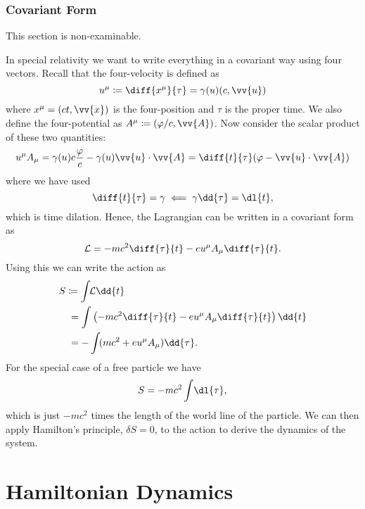 \documentclass[fleqn]{NotesClass}
\newcommand*{\lagrangian}{\mathcal{L}}
\begin{document}
    \subsection{Covariant Form}
    \begin{rmk}
        This section is non-examinable.
    \end{rmk}
    
    In special relativity we want to write everything in a covariant way using four vectors.
    Recall that the four-velocity is defined as
    \begin{equation}
        u^\mu \coloneqq \diff{x^\mu}{\tau} = \gamma(u)(c, \vv{u})
    \end{equation}
    where \(x^\mu = (ct, \vv{x})\) is the four-position and \(\tau\) is the proper time.
    We also define the four-potential as \(A^\mu \coloneqq (\varphi/c, \vv{A})\).
    Now consider the scalar product of these two quantities:
    \begin{align}
        u^\mu A_\mu = \gamma(u)c\frac{\varphi}{c} - \gamma(u)\vv{u}\cdot\vv{A} = \diff{t}{\tau}(\varphi - \vv{u}\cdot\vv{A})
    \end{align}
    where we have used
    \begin{equation}
        \diff{t}{\tau} = \gamma \impliedby \gamma \dd{\tau} = \dl{t},
    \end{equation}
    which is time dilation.
    Hence, the Lagrangian can be written in a covariant form as
    \begin{equation}
        \lagrangian = -mc^2\diff{\tau}{t} - eu^\mu A_\mu \diff{\tau}{t}.
    \end{equation}
    Using this we can write the action as
    \begin{align}
        S &\coloneqq \int \!\! \lagrangian \dd{t}\\
        &\hphantom{:}= \int \left( -mc^2\diff{\tau}{t} - eu^\mu A_\mu \diff{\tau}{t} \right)\dd{t}\\
        &\hphantom{:}= -\int \! (mc^2 + eu^\mu A_\mu) \dd{\tau}.
    \end{align}
    For the special case of a free particle we have
    \begin{equation}
        S = -mc^2 \int \! \dl{\tau},
    \end{equation}
    which is just \(-mc^2\) times the length of the world line of the particle.
    We can then apply Hamilton's principle, \(\delta S = 0\), to the action to derive the dynamics of the system.
    
    \chapter{Hamiltonian Dynamics}
\end{document}
